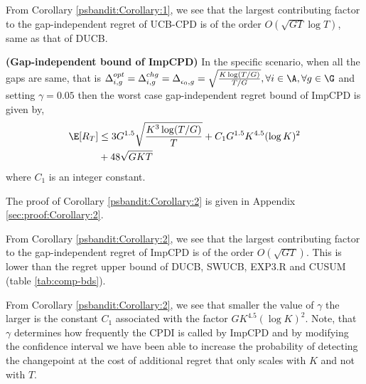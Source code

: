 \begin{discussion}
\label{dis:Corollary:1}
From Corollary \ref{psbandit:Corollary:1}, we see that the largest contributing factor to the gap-independent regret of  UCB-CPD is of the order $O\left( \! \sqrt{GT} \!\log T\right)$, same as that of DUCB. %
\end{discussion}



\begin{customcorollary}{2}\textbf{(Gap-independent bound of ImpCPD)}
\label{psbandit:Corollary:2}
In the specific scenario, when all the gaps are same, that is $\Delta^{opt}_{i,g}=\Delta^{chg}_{i,g}=\Delta^{}_{\epsilon_0, g}=\sqrt{\frac{K\log (T/G)}{T/G}}, \forall i\in\A,\forall g\in\G$ and setting $\gamma = 0.05$ then the worst case gap-independent regret bound of ImpCPD is given by,
\begin{align*}
\E[R_T]&\leq 3G^{1.5}\sqrt{\dfrac{K^3\log (T/G)}{T}} + C_1 G^{1.5}K^{4.5}(\log K)^{2}\\
& + 48\sqrt{GKT}
\end{align*}
where $C_1$ is an integer constant.
\end{customcorollary}

\begin{customproof}{6}
The proof of Corollary \ref{psbandit:Corollary:2} is given in Appendix \ref{sec:proof:Corollary:2}.
\end{customproof}

\begin{discussion}
\label{dis:Corollary:2}
From Corollary \ref{psbandit:Corollary:2}, we see that the largest contributing factor to the gap-independent regret of ImpCPD is of the order $O\left( \sqrt{GT}\right)$. This is lower than the regret upper bound of DUCB, SWUCB, EXP3.R and  CUSUM (table \ref{tab:comp-bds}). 
\end{discussion}

\begin{discussion}
\label{dis:Corollary:2_1}
From Corollary \ref{psbandit:Corollary:2}, we see that smaller the value of $\gamma$ the larger is the constant $C_1$ associated with the factor $GK^{4.5}(\log K)^{2}$. Note, that $\gamma$ determines how frequently the CPDI is called by ImpCPD and by modifying the confidence interval we have been able to increase the probability of detecting the changepoint at the cost of additional regret that only scales with $K$ and not with $T$.
\end{discussion}

